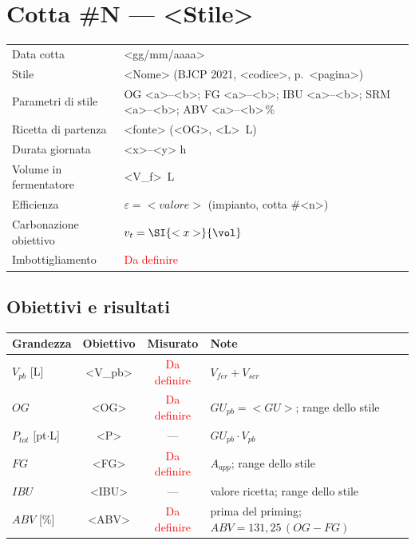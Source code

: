 \section{Cotta \#N --- <Stile>}

\begin{tabularx}{\linewidth}{@{}lX@{}}
\toprule
Data cotta & <gg/mm/aaaa> \\
Stile & <Nome> (BJCP 2021, <codice>, p.~<pagina>) \\
Parametri di stile & OG <a>--<b>; FG <a>--<b>; IBU <a>--<b>; SRM <a>--<b>; ABV <a>--<b>\,\% \\
Ricetta di partenza & <fonte> (<OG>, \SI{<L>}{\liter}) \\
Durata giornata & <x>--<y> \si{\hour} \\
Volume in fermentatore & \SI{<V_f>}{\liter} \\
Efficienza & $\varepsilon = <valore>$ (impianto, cotta \#<n>) \\
Carbonazione obiettivo & $v_t = \SI{<x>}{\vol}$ \\
Imbottigliamento & \textcolor{red}{Da definire} \\
\bottomrule
\end{tabularx}

\subsection*{Obiettivi e risultati}
\begin{tabularx}{\linewidth}{@{}lccX@{}}
\toprule
Grandezza & Obiettivo & Misurato & Note \\
\midrule
$V_{pb}$ [\si{\liter}] & <V_pb> & \textcolor{red}{Da definire} & $V_{fer} + V_{scr}$ \\
$OG$ & <OG> & \textcolor{red}{Da definire} & $GU_{pb} = <GU>$; range dello stile \\
$P_{tot}$ [pt$\cdot$L] & <P> & --- & $GU_{pb} \cdot V_{pb}$ \\
$FG$ & <FG> & \textcolor{red}{Da definire} & $A_{app}$; range dello stile \\
$IBU$ & <IBU> & --- & valore ricetta; range dello stile \\
$ABV$ [\si{\percent}] & <ABV> & \textcolor{red}{Da definire} & prima del priming; $ABV = 131{,}25\,(OG-FG)$ \\
\bottomrule
\end{tabularx}

